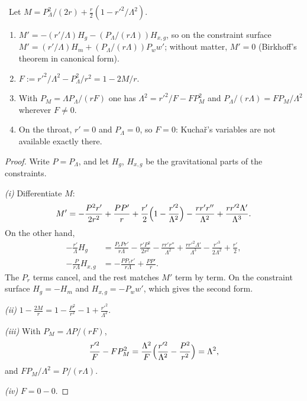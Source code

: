 \begin{theorem}\label{thm:kuchar}\ver\
Let $M=P_\Lambda^2/(2r)+\frac r2(1-r'^2/\Lambda^2)$.
\begin{enumerate}[label=(\roman*)]
\item $M'=-(r'/\Lambda)H_g-(P_\Lambda/(r\Lambda))H_{x,g}$, so on the constraint surface $M'=(r'/\Lambda)H_m+(P_\Lambda/(r\Lambda))P_ww'$; without matter, $M'=0$ (Birkhoff's theorem in canonical form).
\item $F:=r'^2/\Lambda^2-P_\Lambda^2/r^2=1-2M/r$.
\item With $P_M=\Lambda P_\Lambda/(rF)$ one has $\Lambda^2=r'^2/F-FP_M^2$ and $P_\Lambda/(r\Lambda)=FP_M/\Lambda^2$ wherever $F\ne0$.
\item On the throat, $r'=0$ and $P_\Lambda=0$, so $F=0$: Kucha\v{r}'s variables \cite{Kuchar1994} are not available exactly there.
\end{enumerate}
\end{theorem}
\begin{proof}
Write $P=P_\Lambda$, and let $H_g$, $H_{x,g}$ be the gravitational parts of the constraints.

\emph{(i)} Differentiate $M$:
\[
M'=-\frac{P^2r'}{2r^2}+\frac{PP'}r+\frac{r'}2\Bigl(1-\frac{r'^2}{\Lambda^2}\Bigr)-\frac{rr'r''}{\Lambda^2}+\frac{rr'^2\Lambda'}{\Lambda^3}.
\]
On the other hand,
\begin{align*}
-\frac{r'}\Lambda H_g&=\frac{P_rPr'}{r\Lambda}-\frac{r'P^2}{2r^2}-\frac{rr'r''}{\Lambda^2}+\frac{rr'^2\Lambda'}{\Lambda^3}-\frac{r'^3}{2\Lambda^2}+\frac{r'}2,\\
-\frac P{r\Lambda}H_{x,g}&=-\frac{PP_rr'}{r\Lambda}+\frac{PP'}r .
\end{align*}
The $P_r$ terms cancel, and the rest matches $M'$ term by term. On the constraint surface $H_g=-H_m$ and $H_{x,g}=-P_ww'$, which gives the second form.

\emph{(ii)} $1-\frac{2M}r=1-\frac{P^2}{r^2}-1+\frac{r'^2}{\Lambda^2}$.

\emph{(iii)} With $P_M=\Lambda P/(rF)$,
\[
\frac{r'^2}F-FP_M^2=\frac{\Lambda^2}F\Bigl(\frac{r'^2}{\Lambda^2}-\frac{P^2}{r^2}\Bigr)=\Lambda^2 ,
\]
and $FP_M/\Lambda^2=P/(r\Lambda)$.

\emph{(iv)} $F=0-0$.
\end{proof}


